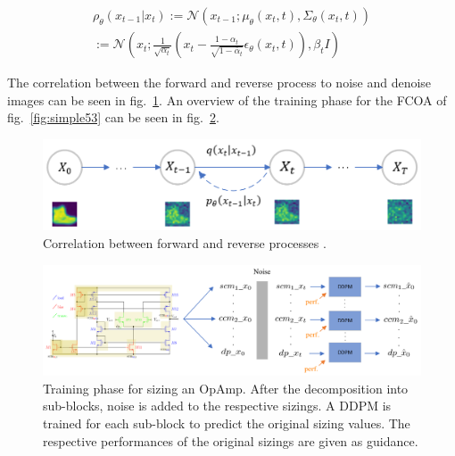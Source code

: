\documentclass[conference]{IEEEtran}
\begin{document}
	\begin{equation} \label{eq:reverse}
	\begin{split}
		\rho_{\theta}(x_{t-1}|x_{t}) := \mathcal{N}(x_{t-1};\mu_{\theta}(x_{t},t),\Sigma_{\theta}(x_{t},t)) \\:= \mathcal{N}(x_{t};\frac{1}{\sqrt{\alpha_{t}}}(x_{t}-\frac{1-\alpha_{t}}{\sqrt{1-\overline{\alpha}_{t}}}\epsilon_{\theta}(x_{t},t)),\beta_{t}I) 
	\end{split}
	\end{equation}
	
	The correlation between the forward and reverse process to noise and denoise images can be seen in fig.~\ref{fig:forward_reverse}. An overview of the training phase for the FCOA of fig.~\ref{fig:simple53} can be seen in fig.~\ref{fig:DDPMtraining}.
	
	\begin{figure}[h]
		\centering
		\includegraphics[width=\linewidth]{figures/ForwardReverseDDPM}
		\setlength{\abovecaptionskip}{0ex}%
		\setlength{\belowcaptionskip}{-2ex}%
		\caption{Correlation between forward and reverse processes \cite{eid24diffusion}.}
		\label{fig:forward_reverse}
	\end{figure}
	
	\begin{figure}[h]
		\centering
		\includegraphics[width=\linewidth]{figures/DDPMSubBlockTraining}
		\setlength{\abovecaptionskip}{0ex}%
		\setlength{\belowcaptionskip}{-2ex}%
		\caption{Training phase for sizing an OpAmp. After the decomposition into sub-blocks, noise is added to the respective sizings. A DDPM is trained for each sub-block to predict the original sizing values. The respective performances of the original sizings are given as guidance.}
		\label{fig:DDPMtraining}
	\end{figure}
	
\end{document}
